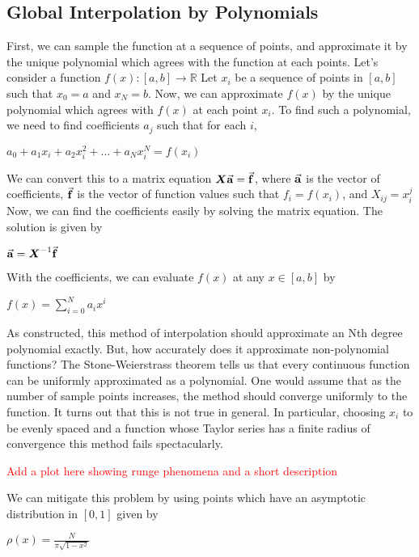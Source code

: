 \documentclass[12pt,letterpaper]{article}
\numberwithin{equation}{section}
\newcommand{\reals}{\mathbb{R}}
\begin{document}
\subsection{Global Interpolation by Polynomials}
First, we can sample the function at a sequence of points, and approximate it by the unique polynomial which agrees with the function at each points. Let's consider a function $f(x) : [a,b] \rightarrow \reals$ Let $x_i$ be a sequence of points in $[a,b]$ such that $x_0 = a$ and $x_N = b$. Now, we can approximate $f(x)$ by the unique polynomial which agrees with $f(x)$ at each point $x_i$. To find such a polynomial, we need to find coefficients $a_j$ such that for each $i$,
\begin{center}
$a_0 + a_1 x_i + a_2 x_i^2 + ... + a_N x_i^N = f(x_i)$
\end{center}

\indent We can convert this to a matrix equation $\boldsymbol{X}\va{a} = \va{f}$, where $\va{a}$ is the vector of coefficients, $\va{f}$ is the vector of function values such that $f_i = f(x_i)$, and $X_{ij} = x_i^j$ Now, we can find the coefficients easily by solving the matrix equation. The solution is given by 
\begin{center}
$\va{a} = \boldsymbol{X}^{-1} \va{f}$
\end{center}
With the coefficients, we can evaluate $f(x)$ at any $x \in [a,b]$ by
\begin{center}
$f(x) = \sum_{i=0}^{N} a_i x^i$ 
\end{center}

\indent As constructed, this method of interpolation should approximate an Nth degree polynomial exactly. But, how accurately does it approximate non-polynomial functions? The Stone-Weierstrass theorem tells us that every continuous function can be uniformly approximated as a polynomial. One would assume that as the number of sample points increases, the method should converge uniformly to the function. It turns out that this is not true in general. In particular, choosing $x_i$ to be evenly spaced and a function whose Taylor series has a finite radius of convergence this method fails spectacularly.
\begin{center}
\textcolor{red}{Add a plot here showing runge phenomena and a short description}
\end{center}

\indent We can mitigate this problem by using points which have an asymptotic distribution in $[0,1]$ given by
\begin{center}
$\rho(x) = \frac{N}{\pi \sqrt{1 - x^2}}$
\end{center}
\end{document}
